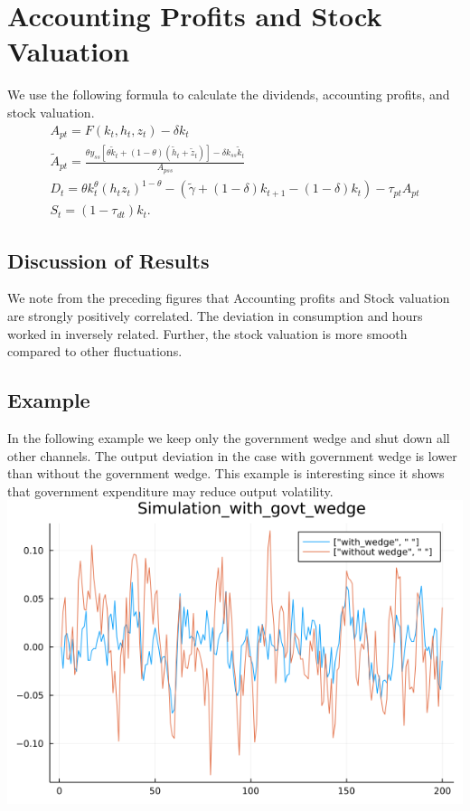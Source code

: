 \documentclass[12pt]{article}
\begin{document}
\section{Accounting Profits and Stock Valuation}
We use the following formula to calculate the dividends, accounting profits, and stock valuation. 
\begin{align*}
A_{pt} = F(k_t, h_t, z_t) - \delta k_t \\
\tilde{A}_{pt} = \frac{\theta y_{ss}[\theta \tilde{k}_t + (1-\theta)(\tilde{h}_t + \tilde{z}_t)] - \delta k_{ss} \tilde{k}_t}{A_{pss}} \\
D_t = \theta k_t^{\theta}(h_t z_t)^{1-\theta} -(\tilde{\gamma} + (1-\delta)k_{t+1} -(1-\delta)k_t) - \tau_{pt}A_{pt} \\
S_t = (1-\tau_{dt})k_t.
\end{align*}

\subsection{Discussion of Results}
We note from the preceding figures that Accounting profits and Stock valuation are strongly positively correlated. The deviation in consumption and hours worked in inversely related. Further, the stock valuation is more smooth compared to other fluctuations.

\subsection{Example}
In the following example we keep only the government wedge and shut down all other channels. The output deviation in the case with government wedge is lower than without the government wedge. This example is interesting since it shows that government expenditure may reduce output volatility.
\includegraphics[scale=0.5]{figure5.png} %


%
\end{document}
